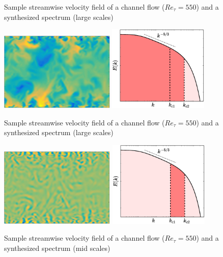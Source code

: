 \documentclass{beamer}
\begin{document}
\begin{frame}
\begin{overprint}
\begin{figure}
		\caption*{Sample streamwise velocity field of a channel flow ($ Re_\tau = 550$) and a synthesized spectrum (large scales)}
	\end{figure}
	\begin{figure}
		\includegraphics[height=3.75cm,valign=t]{./figures/turbulence/Ulargemid.png}
		\includegraphics[height=4.1cm,valign=t]{./figures/turbulence/turbulence_spectra_variousranges12.eps}
		\caption*{Sample streamwise velocity field of a channel flow ($ Re_\tau = 550$) and a synthesized spectrum (large scales)}
	\end{figure}	
	\begin{figure}
		\includegraphics[height=3.75cm,valign=t]{./figures/turbulence/Umid.png}
		\includegraphics[height=4.1cm,valign=t]{./figures/turbulence/turbulence_spectra_variousranges2.eps}
		\caption*{Sample streamwise velocity field of a channel flow ($ Re_\tau = 550$) and a synthesized spectrum (mid scales)}

\end{figure}
\end{overprint}
\end{frame}
\end{document}
